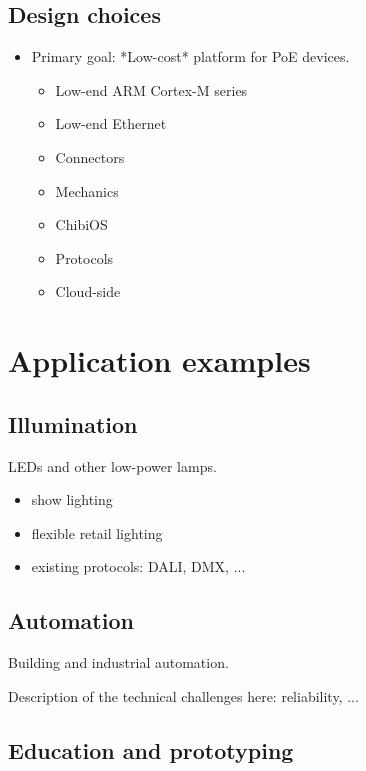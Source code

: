 \documentclass[draft,a4paper]{siamltex}
\begin{document}
\subsection{Design choices}
 
\begin{itemize}
  \item Primary goal: *Low-cost* platform for PoE devices.
    \begin{itemize}
    \item Low-end ARM Cortex-M series
    \item Low-end Ethernet
    \item Connectors
    \item Mechanics
    \item ChibiOS
    \item Protocols
    \item Cloud-side
    \end{itemize}
\end{itemize}


\section{Application examples}
\label{sec:examples}

\subsection{Illumination}

LEDs and other low-power lamps.

\begin{itemize}
  \item show lighting
  \item flexible retail lighting
  \item existing protocols: DALI, DMX, ...
\end{itemize}

\subsection{Automation}

Building and industrial automation.

Description of the technical challenges here: reliability, ...

\subsection{Education and prototyping}
\end{document}
